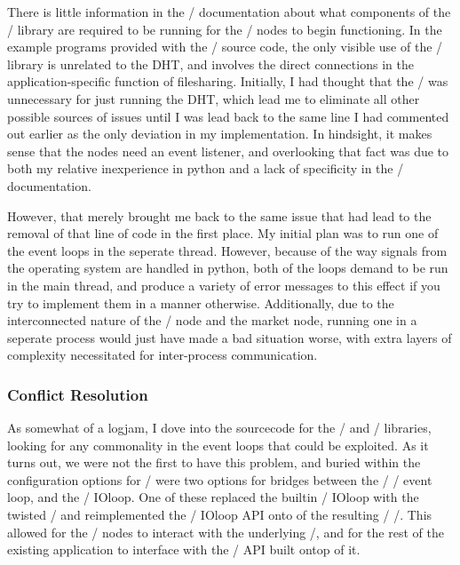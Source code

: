 \documentclass[12pt,twocolumn]{article}
\begin{document}
There is little information in the \Entangled/ documentation about what components of the \Twisted/ library are required to be running for the \Entangled/ nodes to begin functioning.
In the example programs provided with the \Entangled/ source code, the only visible use of the \Twisted/ library is unrelated to the DHT, and involves the direct connections in the application-specific function of filesharing.
Initially, I had thought that the \reactor/ was unnecessary for just running the DHT, which lead me to eliminate all other possible sources of issues until I was lead back to the same line I had commented out earlier as the only deviation in my implementation.
In hindsight, it makes sense that the nodes need an event listener, and overlooking that fact was due to both my relative inexperience in python and a lack of specificity in the \Entangled/ documentation.

However, that merely brought me back to the same issue that had lead to the removal of that line of code in the first place.
My initial plan was to run one of the event loops in the seperate thread.
However, because of the way signals from the operating system are handled in python, both of the loops demand to be run in the main thread, and produce a variety of error messages to this effect if you try to implement them in a manner otherwise.
Additionally, due to the interconnected nature of the \Entangled/ node and the market node, running one in a seperate process would just have made a bad situation worse, with extra layers of complexity necessitated for inter-process communication.

\subsubsection{Conflict Resolution}
As somewhat of a logjam, I dove into the sourcecode for the \Tornado/ and \Twisted/ libraries, looking for any commonality in the event loops that could be exploited. As it turns out, we were not the first to have this problem, and buried within the configuration options for \Tornado/ were two options for bridges between the \Twisted/ \reactor/ event loop, and the \Tornado/ IOloop. One of these replaced the builtin \Tornado/ IOloop with the twisted \reactor/ and reimplemented the \Tornado/ IOloop API onto of the resulting \Twisted/ \reactor/. This allowed for the \Entangled/ nodes to interact with the underlying \reactor/, and for the rest of the existing application to interface with the \Tornado/ API built ontop of it.
\end{document}
